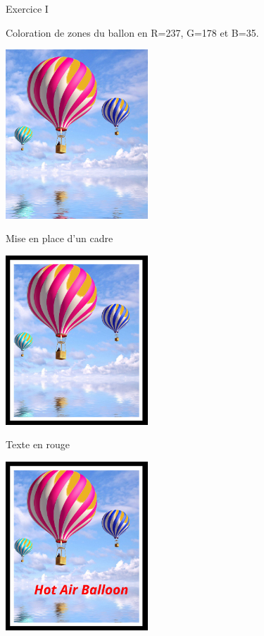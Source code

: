 \documentclass[10pt,svgnames,usenames,table]{beamer}
\begin{document}
\begin{frame}[allowframebreaks]{Exercice I}
\begin{center}
	\end{center}
	\framebreak
	Coloration de zones du ballon en R=237, G=178 et B=35.
	\begin{center}
		\includegraphics[width=0.4\textwidth]{Images/ex1/Ex1_step3.jpg}
	\end{center}
	\framebreak
	Mise en place d'un cadre
	\begin{center}
		\includegraphics[width=0.4\textwidth]{Images/ex1/Ex1_step4.jpg}
	\end{center}
	\framebreak
	Texte en rouge
	\begin{center}
		\includegraphics[width=0.4\textwidth]{Images/ex1/Ex1_step5.jpg}
	\end{center}
\end{frame}
\end{document}
